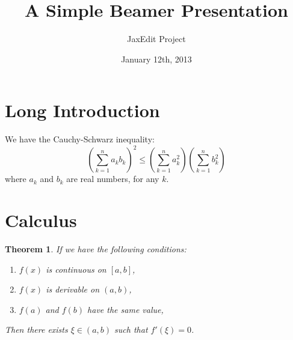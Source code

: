 \documentclass{beamer}
\newtheorem{thm}{Theorem}
\begin{document}
\title{A Simple Beamer Presentation}
\author{JaxEdit Project}
\date{January 12th, 2013}
\maketitle

\tableofcontents

\section[Introduction]{Long Introduction}

\begin{frame}
We have the Cauchy-Schwarz inequality:
  \[ \left( \sum_{k=1}^n a_k b_k \right)^2 \leq \left( \sum_{k=1}^n a_k^2 \right) \left( \sum_{k=1}^n b_k^2 \right) \]
where $a_k$ and $b_k$ are real numbers, for any $k$.
\end{frame}

\section{Calculus}

\begin{frame}
\begin{thm}
If we have the following conditions:
\begin{enumerate}
\item $f(x)$ is continuous on $[a,b]$,
\item $f(x)$ is derivable on $(a,b)$,
\item $f(a)$ and $f(b)$ have the same value,
\end{enumerate}
Then there exists $\xi\in(a,b)$ such that $f'(\xi)=0$.
\end{thm}
\end{frame}
\end{document}
